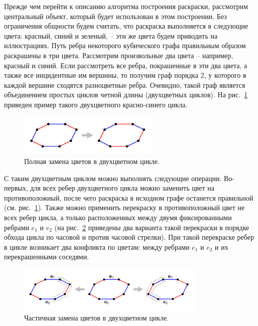 Прежде чем перейти к описанию алгоритма построения раскраски, рассмотрим центральный объект, который будет использован в этом построении.
Без ограничения общности будем считать, что раскраска выполняется в следующие цвета: красный, синий и зеленый, -- эти же цвета будем приводить на иллюстрациях.
Путь ребра некоторого кубического графа правильным образом раскрашены в три цвета.
Рассмотрим произвольные два цвета -- например, красный и синий.
Если рассмотреть все ребра, покрашенные в эти два цвета, а также все инцидентные им вершины, то получим граф порядка 2, у которого в каждой вершине сходятся разноцветные ребра.
Очевидно, такой граф является объединением простых циклов четной длины (двухцветных циклов)\label{term:bicolor_cycle}.
На рис.~\ref{fig:text_3_edge_coloring_4} приведен пример такого двухцветного красно-синего цикла.

\begin{figure}[ht]
\centering
\includegraphics[width=0.6\textwidth]{./pics/text_3_edge_coloring/4-bicolor-cycle.pdf}
\singlespacing
{}\caption{Полная замена цветов в двухцветном цикле.}
\label{fig:text_3_edge_coloring_4}
\end{figure}

С таким двухцветным циклом можно выполнять следующие операции.
Во-первых, для всех ребер двухцветного цикла можно заменить цвет на противоположный, после чего раскраска в исходном графе останется правильной (см. рис.~\ref{fig:text_3_edge_coloring_4}).
Также можно применить перекраску в противоположный цвет не всех ребер цикла, а только расположенных между двумя фиксированными ребрами $e_1$ и $e_2$ (на рис.~\ref{fig:text_3_edge_coloring_5} приведены два варианта такой перекраски в порядке обхода цикла по часовой и против часовой стрелки).
При такой перекраске ребер в цикле возникает два конфликта по цветам: между ребрами $e_1$ и $e_2$ и их перекрашенными соседями.

\begin{figure}[ht]
\centering
\includegraphics[width=0.8\textwidth]{./pics/text_3_edge_coloring/5-bicolor-cycle-partial-switch.pdf}
\singlespacing
{}\caption{Частичная замена цветов в двухцветном цикле.}
\label{fig:text_3_edge_coloring_5}
\end{figure}

